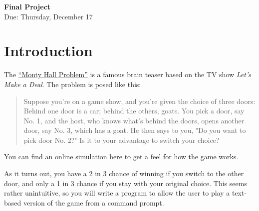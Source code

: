 \documentclass{article}
\begin{document}
\fancyfoot[C]{\thepage}
\vspace*{0cm}
\begin{center}
	{\LARGE \textbf{Final Project}}\\
	\vspace{0.25cm}
	{\Large Due: Thursday, December 17}
\end{center}

\section*{Introduction}
The  \href{https://en.wikipedia.org/wiki/Monty_Hall_problem}{``Monty Hall Problem''} is a famous brain teaser based on the TV show \textit{Let's Make a Deal}. The problem is posed like this:
\begin{quotation}
	Suppose you're on a game show, and you're given the choice of three doors: Behind one door is a car; behind the others, goats. You pick a door, say No. 1, and the host, who knows what's behind the doors, opens another door, say No. 3, which has a goat. He then says to you, "Do you want to pick door No. 2?" Is it to your advantage to switch your choice?
\end{quotation}
You can find an online simulation \href{https://www.mathwarehouse.com/monty-hall-simulation-online/}{here} to get a feel for how the game works.

As it turns out, you have a 2 in 3 chance of winning if you switch to the other door, and only a 1 in 3 chance if you stay with your original choice. This seems rather unintuitive, so you will write a program to allow the user to play a text-based version of the game from a command prompt.
\end{document}
